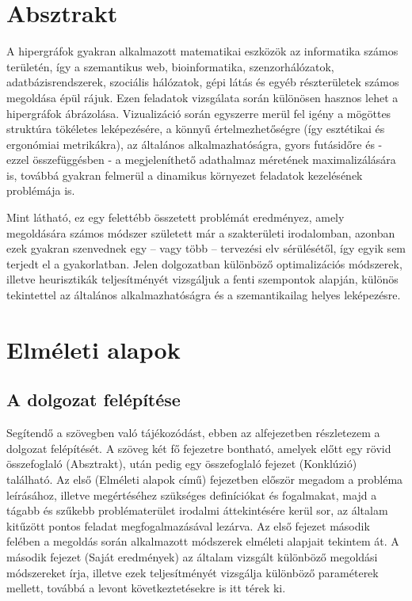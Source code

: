 

\chapter{Absztrakt}

A hipergráfok gyakran alkalmazott matematikai eszközök az informatika számos területén, így a szemantikus web, bioinformatika, szenzorhálózatok, adatbázisrendszerek, szociális hálózatok, gépi látás és egyéb részterületek számos megoldása épül rájuk.
Ezen feladatok vizsgálata során különösen hasznos lehet a hipergráfok ábrázolása. Vizualizáció során egyszerre merül fel igény a mögöttes struktúra tökéletes leképezésére, a könnyű értelmezhetőségre (így esztétikai és ergonómiai metrikákra), az általános alkalmazhatóságra, gyors futásidőre és - ezzel összefüggésben - a megjeleníthető adathalmaz méretének maximalizálására is, továbbá gyakran felmerül a dinamikus környezet feladatok kezelésének problémája is.


Mint látható, ez egy felettébb összetett problémát eredményez, amely megoldására számos módszer született már a szakterületi irodalomban, azonban ezek gyakran szenvednek egy -- vagy több -- tervezési elv sérülésétől, így egyik sem terjedt el a gyakorlatban.
Jelen dolgozatban különböző optimalizációs módszerek, illetve heurisztikák teljesítményét vizsgáljuk a fenti szempontok alapján, különös tekintettel az általános alkalmazhatóságra és a szemantikailag helyes leképezésre.

\chapter{Elméleti alapok}
\label{ch:intro}

\section{A dolgozat felépítése}

Segítendő a szövegben való tájékozódást, ebben az alfejezetben részletezem a dolgozat felépítését. A szöveg két fő fejezetre bontható, amelyek előtt egy rövid összefoglaló (Absztrakt), után pedig egy összefoglaló fejezet (Konklúzió) található. Az első (Elméleti alapok című) fejezetben először megadom a probléma leírásához, illetve megértéséhez szükséges definíciókat és fogalmakat, majd a tágabb és szűkebb problématerület irodalmi áttekintésére kerül sor, az általam kitűzött pontos feladat megfogalmazásával lezárva. Az első fejezet második felében a megoldás során alkalmazott módszerek elméleti alapjait tekintem át. A második fejezet (Saját eredmények) az általam vizsgált különböző megoldási módszereket írja, illetve ezek teljesítményét vizsgálja különböző paraméterek mellett, továbbá a levont következtetésekre is itt térek ki.

